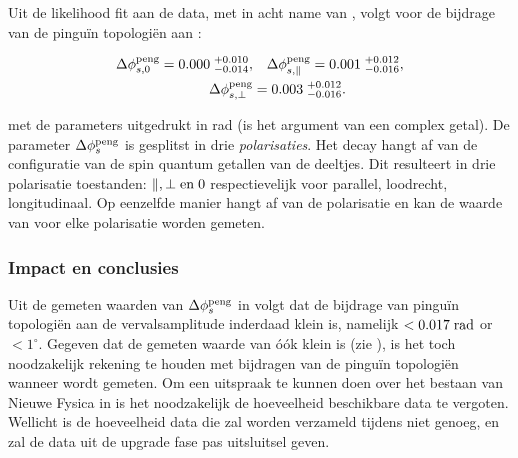 Uit de likelihood fit aan de data, met in acht name van \cite{Fleischer:1999zi,Faller:2008gt,DeBruyn:2014oga,DeBruyn-thesis}, volgt voor de bijdrage van de pingu\"in topologi\"en aan \phis:


\begin{align}
\label{app_nl_delta_phis_result}
  \Delta\phi^{\rm peng}_{s,{0}}         = 0.000 \; ^{+0.010}_{-0.014}, &\quad  \Delta\phi^{\rm peng}_{s,{\parallel}} = 0.001 \; ^{+0.012}_{-0.016}, \nonumber \\
  \Delta\phi^{\rm peng}_{s,{\perp}}     &= 0.003 \; ^{+0.012}_{-0.016}.
\end{align}


\noindent met de parameters uitgedrukt in rad (\phis is het argument van een complex getal). De parameter $\Delta\phi_{s}^{\tiny\text{peng}}$ is gesplitst in drie {\it polarisaties}. Het decay  \BsJpsiPhi hangt af van de configuratie van de spin quantum getallen van de deeltjes. Dit resulteert in drie polarisatie toestanden: $\parallel,\perp {\rm en}\; 0$ respectievelijk voor parallel, loodrecht, longitudinaal. Op eenzelfde manier hangt \phis af van de polarisatie en kan de waarde van \phis voor elke polarisatie worden gemeten.

\subsubsection{Impact en conclusies}
Uit de gemeten waarden van $\Delta\phi_{s}^{\tiny\text{peng}}$ in  volgt dat de bijdrage van pingu\"in topologi\"en aan de \BsJpsiPhi vervalsamplitude inderdaad klein is, namelijk  $<0.017 \; {\rm rad}$ or $<1^\circ$. Gegeven dat de gemeten waarde van \phis \'o\'ok klein is (zie ), is het toch noodzakelijk rekening te houden met bijdragen van de pingu\"in topologi\"en wanneer \phis wordt gemeten. Om een uitspraak te kunnen doen over het bestaan van Nieuwe Fysica in \phis is het noodzakelijk de hoeveelheid beschikbare data te vergoten. Wellicht is de hoeveelheid data die zal worden verzameld tijdens \lhcb \runtwo niet genoeg, en zal de data uit de upgrade fase pas uitsluitsel geven.




%
%
%
